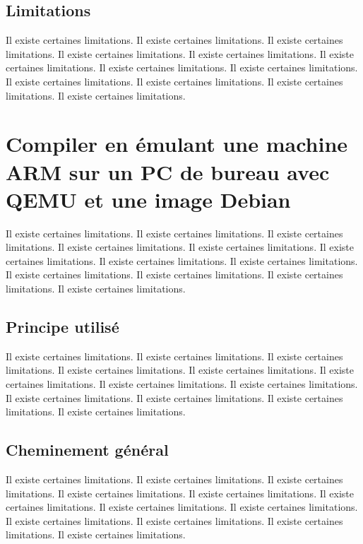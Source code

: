 \documentclass[11pt,a4paper,oneside]{report}
\begin{document}
\subsection{Limitations}

Il existe certaines limitations.
Il existe certaines limitations.
Il existe certaines limitations.
Il existe certaines limitations.
Il existe certaines limitations.
Il existe certaines limitations.
Il existe certaines limitations.
Il existe certaines limitations.
Il existe certaines limitations.
Il existe certaines limitations.
Il existe certaines limitations.
Il existe certaines limitations.


\section{Compiler en émulant une machine ARM sur un PC de bureau avec QEMU et une image Debian}

Il existe certaines limitations.
Il existe certaines limitations.
Il existe certaines limitations.
Il existe certaines limitations.
Il existe certaines limitations.
Il existe certaines limitations.
Il existe certaines limitations.
Il existe certaines limitations.
Il existe certaines limitations.
Il existe certaines limitations.
Il existe certaines limitations.
Il existe certaines limitations.
\subsection{Principe utilisé}

Il existe certaines limitations.
Il existe certaines limitations.
Il existe certaines limitations.
Il existe certaines limitations.
Il existe certaines limitations.
Il existe certaines limitations.
Il existe certaines limitations.
Il existe certaines limitations.
Il existe certaines limitations.
Il existe certaines limitations.
Il existe certaines limitations.
Il existe certaines limitations.
\subsection{Cheminement général}

Il existe certaines limitations.
Il existe certaines limitations.
Il existe certaines limitations.
Il existe certaines limitations.
Il existe certaines limitations.
Il existe certaines limitations.
Il existe certaines limitations.
Il existe certaines limitations.
Il existe certaines limitations.
Il existe certaines limitations.
Il existe certaines limitations.
Il existe certaines limitations.
\end{document}

